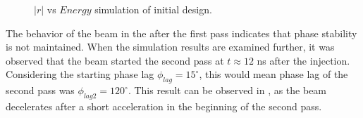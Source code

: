 \documentclass{article}
\begin{document}
\begin{figure}[H]
    \centering
    \vspace{20pt}
    \vspace{20pt}
    \caption{\centering $|r|$ vs $Energy$ simulation of initial design.} 
    \label{fig:initial_designs_PIC_phase_space_monitor}
\end{figure}
The behavior of the beam in the  after the first pass indicates that phase stability is not maintained. 
When the simulation results are examined further, it was observed that the beam started the second pass at $t \approx 12$ ns after the injection. 
Considering the starting phase lag $\phi_{lag}=15^\circ$, this would mean phase lag of the second pass was $\phi_{lag2}=120^\circ$.
This result can be observed in , as the beam decelerates after a short acceleration in the beginning of the second pass.
\end{document}
